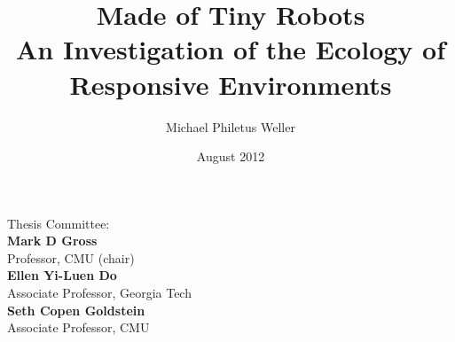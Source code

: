 \documentclass[12pt,letterpaper,notitlepage,onecolumn]{report}
\title{\textbf{Made of Tiny Robots}\\
{\large An Investigation of the Ecology of Responsive Environments}}
\author{Michael Philetus Weller}
\date{August 2012}
\begin{document}
\maketitle
\thispagestyle{empty}

{\centering
Thesis Committee:\\[\baselineskip]

\textbf{Mark D Gross}\\
Professor, CMU (chair)\\[\baselineskip]

\textbf{Ellen Yi-Luen Do}\\
Associate Professor, Georgia Tech\\[\baselineskip]

\textbf{Seth Copen Goldstein}\\
Associate Professor, CMU\\
}

\newpage
\abstract{%

}

\newpage
\setcounter{tocdepth}{1}
\tableofcontents
\newpage






%
\appendix





%
\end{document}
